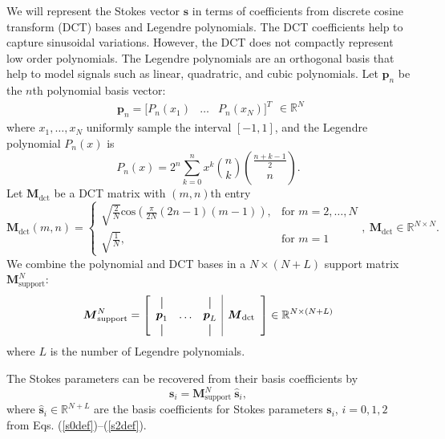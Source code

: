 \documentclass[10pt]{article}
\numberwithin{equation}{subsection}
\newcommand{\lbf}[1]{\ensuremath{{\boldsymbol #1}}}
\newcommand{\for}{\text{for }}
\begin{document}
    We will represent the Stokes vector $\lbf s$ in terms of coefficients from discrete cosine transform (DCT) bases and Legendre polynomials.
    The DCT coefficients help to capture sinusoidal variations.
    However, the DCT does not compactly represent low order polynomials.
    The Legendre polynomials are an orthogonal basis that help to model signals such as linear, quadratric, and cubic polynomials.
Let $\lbf p_n$ be the $n$th polynomial basis vector:
    \begin{equation}
        \begin{array}{cccc}
            \lbf p_n = \bigl[P_n(x_1) & \ldots & P_n(x_N)\bigr]^T
        \end{array} \in \mathbb R^{N}
    \end{equation}
where $x_1, \ldots, x_N$ uniformly sample the interval $[-1, 1]$, and the Legendre polynomial $P_n(x)$ is
    \begin{equation}
        P_n(x) = 2^n \sum_{k = 0}^n x^k \binom{n}{k} \binom{\frac{n + k - 1}{2}}{n}.
    \end{equation}
Let $\lbf M_{\text{dct}}$ be a DCT matrix with $(m, n)$th entry
    \begin{equation}
        \lbf M_{\text{dct}}(m, n) = \begin{cases}
            \sqrt{\frac{2}{N}} \text{cos} \left( \frac{\pi}{2 N} (2 n - 1) (m - 1) \right), & \for m = 2, \ldots, N \\
            \sqrt{\frac{1}{N}}, & \for m = 1
        \end{cases}, ~\lbf M_{\text{dct}} \in \mathbb R^{N \times N}.
    \end{equation}
We combine the polynomial and DCT bases in a $N \times (N + L)$  support matrix $\lbf M_{\text{support}}^N$:
    \begin{equation}
        \lbf M_{\text{support}}^N = \left[ \begin{array}{ccc|c}
            \vertbar &  & \vertbar & \\
            \lbf p_1 & \ldots & \lbf p_L & \lbf M_{\text{dct}} \\
            \vertbar &  & \vertbar & \\
        \end{array} \right] \in \mathbb R^{N \times (N + L)}
    \end{equation}
where $L$ is the number of Legendre polynomials.

The Stokes parameters can be recovered from their basis coefficients by
    \begin{equation}
            \lbf s_i = \lbf M_{\text{support}}^N ~\widehat{\lbf s}_i,
            \label{eqn:RecoverStokesi}
    \end{equation}
where $ \widehat{\lbf s}_i \in \mathbb R^{N + L}$ are the basis coefficients for Stokes parameters $ \lbf s_i $, $i = 0, 1, 2$ from Eqs. (\ref{s0def})--(\ref{s2def}).
\end{document}
